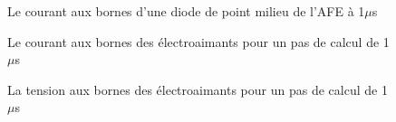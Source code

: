 \begin{figure}[htb]
\caption{Le courant aux bornes d'une diode de point milieu de l'AFE à 1$\mu$s}
\label{AF_DC_DI2}
\end{figure}


\begin{figure}[htb]
\caption{Le courant aux bornes des électroaimants pour un pas de calcul de 1$\mu$s}
\label{AF_DC_CHA1}
\end{figure}



\begin{figure}[htb]
\caption{La tension aux bornes des électroaimants pour un pas de calcul de 1$\mu$s}
\label{AF_DC_CHV1}
\end{figure}



